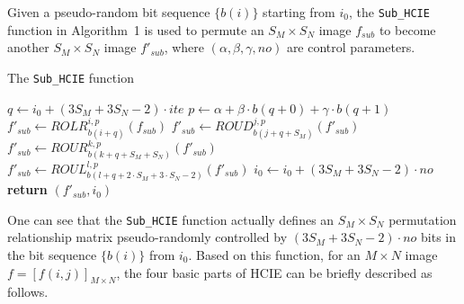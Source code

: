 \documentclass[final,3p,times,twocolumn]{elsarticle}
\begin{document}
Given a pseudo-random bit sequence $\{b(i)\}$ starting from $i_0$,
the \texttt{Sub\_HCIE} function in Algorithm~1 is used to permute an
$S_M\times S_N$ image $f_{sub}$ to become another $S_M\times S_N$
image $f'_{sub}$, where $(\alpha,\beta,\gamma,no)$ are control
parameters.
\begin{algorithm}
\caption{The \texttt{Sub\_HCIE} function}
\begin{algorithmic}[1]
  \State $q \leftarrow i_0+(3S_M+3S_N-2)\cdot ite$
  \State $p \leftarrow \alpha+\beta \cdot b(q+0)+\gamma \cdot b(q+1)$
  \State $f'_{sub}\leftarrow ROLR^{i,p}_{b(i+q)}(f_{sub})$
  \EndFor
  \State $f'_{sub}\leftarrow ROUD^{j,p}_{b(j+q+S_M)}(f'_{sub})$
  \EndFor
  \State $f'_{sub}\leftarrow ROUR^{k,p}_{b(k+q+S_M+S_N)}(f'_{sub})$
  \EndFor
  \State $f'_{sub}\leftarrow ROUL^{l,p}_{b(l+q+2\cdot S_M+3\cdot S_N-2)}(f'_{sub})$
  \EndFor
\EndFor
\State $i_0\leftarrow i_0+(3S_M+3S_N-2)\cdot no$
\State \textbf{return} $(f'_{sub}, i_0)$
\EndFunction
\end{algorithmic}
\end{algorithm}
One can see that the \texttt{Sub\_HCIE} function actually
defines an $S_M\times S_N$ permutation relationship matrix pseudo-randomly
controlled by $(3S_M+3S_N-2)\cdot no$ bits in the bit sequence
$\{b(i)\}$ from $i_0$. Based on this function, for an $M\times N$
image $f=[f(i,j)]_{M\times N}$, the four basic parts of HCIE
can be briefly described as follows.
\end{document}

